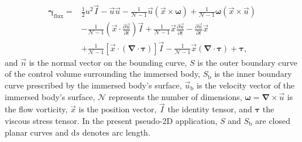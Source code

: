 \documentclass[wes, manuscript]{copernicus}
\begin{document}
\begin{equation}\label{eq:Flux}
    \begin{split}
        \boldsymbol{\gamma}_\textrm{flux} = & \frac{1}{2} u^2 \vec{I} - \vec{u}\vec{u} - \frac{1}{\mathscr{N}-1} \vec{u} \left(\vec{x}\times\boldsymbol{\omega}\right)  + \frac{1}{\mathscr{N}-1} \boldsymbol{\omega} \left(\vec{x}\times \vec{u}\right) \\
        & -\frac{1}{\mathscr{N}-1} \left(\vec{x}\cdot \frac{\partial\vec{u}}{\partial t}\right) \vec{I} + \frac{1}{\mathscr{N}-1} \vec{x} \frac{\partial\vec{u}}{\partial t} - \frac{\partial\vec{u}}{\partial t}\vec{x}\\
        & +\frac{1}{\mathscr{N}-1} \left[\vec{x} \cdot \left(\boldsymbol{\nabla} \cdot\boldsymbol{\tau} \right)\right] \vec{I} - \frac{1}{\mathscr{N}-1} \vec{x} \left( \boldsymbol{\nabla}\cdot \boldsymbol{\tau}\right) + \boldsymbol{\tau} ,
\end{split}
\end{equation}
and $\vec{n}$ is the normal vector on the bounding curve, $S$ is the outer boundary curve of the control volume surrounding the immersed body, $S_{\textrm{b}}$ is the inner boundary curve prescribed by the immersed body's surface, $\vec{u}_{\textrm{b}}$ is the velocity vector of the immersed body's surface, $\mathscr{N}$ represents the number of dimensions, $\boldsymbol{\omega}=\boldsymbol{\nabla}\times\vec{u}$ is the flow vorticity, $\vec{x}$ is the position vector, $\vec{I}$ the identity tensor, and $\boldsymbol{\tau}$ the viscous stress tensor. 
In the present pseudo-2D application, $S$ and $S_{\textrm{b}}$ are closed planar curves and $\mathrm{d}s$ denotes arc length. 
\end{document}
